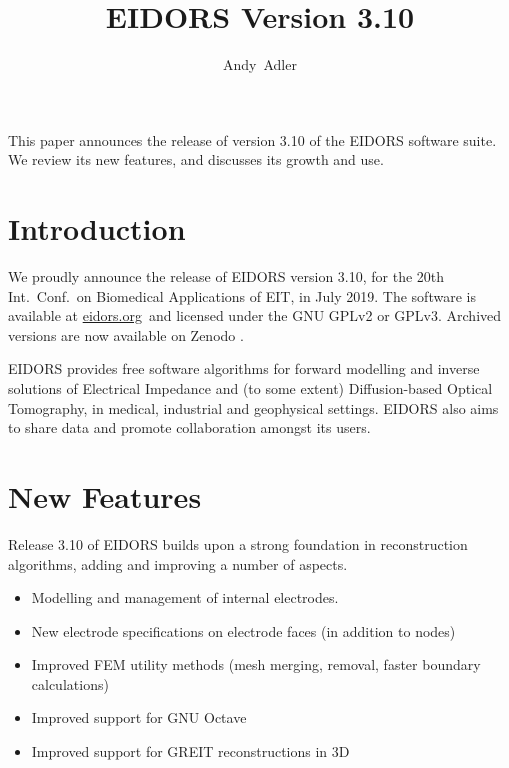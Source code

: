 \documentclass[10pt,letterpaper]{article}
\title{EIDORS Version 3.10%
\vspace{-2ex}} %
\author{Andy~Adler}
\affil{Carleton University, Ottawa, Canada}
\date{}
\begin{document}
\maketitle
\vspace{-1.5cm}
\thispagestyle{empty}

\begin{multicols}{2}

This paper announces the release of version 3.10 of the
EIDORS software suite. We review its new features, and 
discusses its growth and use.

\section{Introduction}
We proudly announce the release of EIDORS version 3.10,
for the 20th Int.\ Conf.\ on Biomedical Applications of EIT,
in July 2019.
The software is available at \href{www.eidors.org}{eidors.org}\, and licensed under the GNU GPLv2 or GPLv3. Archived versions are now available on Zenodo
\cite{eidors3p10,
      eidors3p9p1,
      eidors3p9,
      eidors3p8}.


EIDORS provides free software algorithms for forward modelling
and inverse solutions
of Electrical Impedance and (to some extent) Diffusion-based Optical Tomography, in
medical, industrial and geophysical settings.
EIDORS also aims to share data and promote
collaboration amongst its users.

\section{New Features}
Release 3.10 of EIDORS builds upon a strong foundation in reconstruction
algorithms, adding and improving a number of aspects.
\begin{itemize}
\item Modelling and management of internal electrodes.

\item New electrode specifications on electrode faces (in addition to nodes)

\item Improved FEM utility methods (mesh merging, removal, faster boundary calculations)

\item Improved support for GNU Octave

\item Improved support for GREIT reconstructions in 3D \cite{grychtol2019}


\end{itemize}
\end{multicols}
\end{document}

